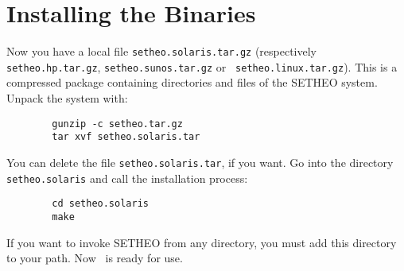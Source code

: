 %
\section{Installing the Binaries}\label{sec:inst-bin}

Now you have a local file {\tt setheo.solaris.tar.gz} (respectively
{\tt setheo.hp.tar.gz}, {\tt setheo.sunos.tar.gz} or {\tt
setheo.linux.tar.gz}). This is a compressed package containing
directories and files of the SETHEO system. Unpack the system with:
\begin{verbatim}
        gunzip -c setheo.tar.gz
        tar xvf setheo.solaris.tar
\end{verbatim}
You can delete the file {\tt setheo.solaris.tar}, if you want. Go into
the directory {\tt setheo.solaris} and call the installation process: 
\begin{verbatim}
        cd setheo.solaris
        make
\end{verbatim}
If you want to invoke SETHEO from any directory, you must add this
directory to your path. Now \SE\ is ready for use.
